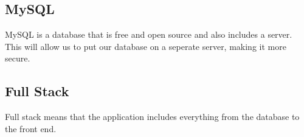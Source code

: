 \documentclass[12pt]{article}
\begin{document}
        \subsection{MySQL}
                MySQL is a database that is free and open source and also includes
                a server. This will allow us to put our database on a seperate 
                server, making it more secure.

        \subsection{Full Stack}
                Full stack means that the application includes everything from
                the database to the front end.
\end{document}
